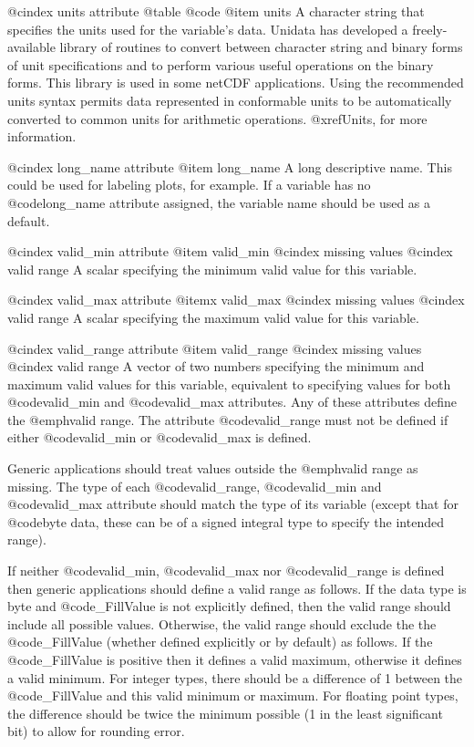 @cindex units attribute
@table @code
@item units
A character string that specifies the units used for the variable's data.
Unidata has developed a
freely-available library of routines to convert between character string
and binary forms of unit specifications and to perform various useful
operations on the binary forms.  This library is used in some netCDF
applications.  Using the recommended units syntax permits data
represented in conformable units to be automatically converted to common
units for arithmetic operations.  @xref{Units}, for more information.

@cindex long_name attribute
@item long_name
A long descriptive name.  This could be used for labeling plots, for
example.  If a variable has no @code{long_name} attribute assigned, the
variable name should be used as a default.

@cindex valid_min attribute
@item valid_min
@cindex missing values
@cindex valid range
A scalar specifying the minimum valid value for this variable.

@cindex valid_max attribute
@itemx valid_max
@cindex missing values
@cindex valid range
A scalar specifying the maximum valid value for this variable.

@cindex valid_range attribute
@item valid_range
@cindex missing values
@cindex valid range
A vector of two numbers specifying the minimum and maximum valid values
for this variable, equivalent to specifying values for both
@code{valid_min} and @code{valid_max} attributes.
Any of these attributes define the @emph{valid range}.
The attribute @code{valid_range} must not be defined if either
@code{valid_min} or @code{valid_max} is defined.

Generic applications should treat values outside the @emph{valid range}
as missing.
The type of each @code{valid_range}, @code{valid_min} and
@code{valid_max} attribute should match the type of its variable (except
that for @code{byte} data, these can be of a signed integral type to
specify the intended range).

If neither @code{valid_min}, @code{valid_max} nor @code{valid_range} is
defined then generic applications should define a valid range as follows.
If the data type is byte and @code{_FillValue} is not explicitly defined,
then the valid range should include all possible values.
Otherwise, the valid range should exclude the the @code{_FillValue} 
(whether defined explicitly or by default) as follows.
If the @code{_FillValue} is positive then it defines a valid maximum,
otherwise it defines a valid minimum.
For integer types, there should be a difference of 1
between the @code{_FillValue} and this valid minimum or maximum.
For floating point types, the difference should be twice the minimum 
possible (1 in the least significant bit) to allow for rounding error.

